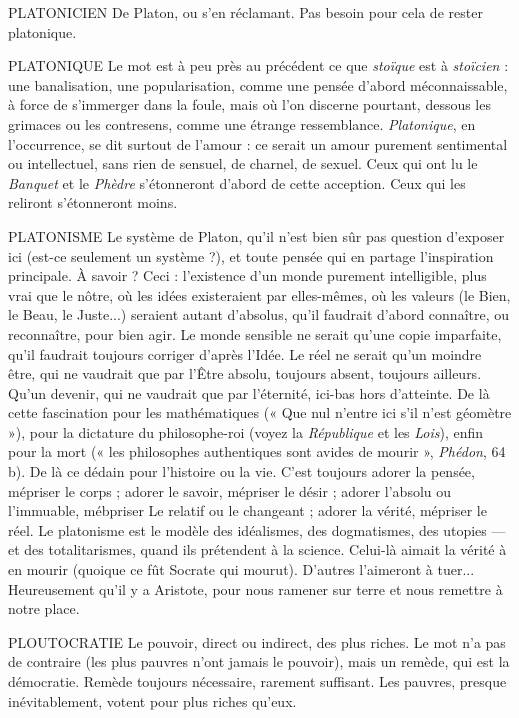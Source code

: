 PLATONICIEN De Platon, ou s’en réclamant. Pas besoin pour cela de rester
platonique.

PLATONIQUE Le mot est à peu près au précédent ce que {\it stoïque} est à
{\it stoïcien} : une banalisation, une popularisation, comme une
pensée d’abord méconnaissable, à force de s’immerger dans la foule, mais où
l’on discerne pourtant, dessous les grimaces ou les contresens, comme une
étrange ressemblance. {\it Platonique}, en l'occurrence, se dit surtout de l’amour : ce
serait un amour purement sentimental ou intellectuel, sans rien de sensuel, de
charnel, de sexuel. Ceux qui ont lu le {\it Banquet} et le {\it Phèdre} s'étonneront d’abord
de cette acception. Ceux qui les reliront s’étonneront moins.

PLATONISME Le système de Platon, qu’il n’est bien sûr pas question d’exposer
ici (est-ce seulement un système ?), et toute pensée
qui en partage l'inspiration principale. À savoir ? Ceci : l'existence d’un monde
purement intelligible, plus vrai que le nôtre, où les idées existeraient par elles-mêmes,
où les valeurs (le Bien, le Beau, le Juste...) seraient autant d’absolus,
qu’il faudrait d’abord connaître, ou reconnaître, pour bien agir. Le monde sensible
ne serait qu’une copie imparfaite, qu’il faudrait toujours corriger d’après
l’Idée. Le réel ne serait qu’un moindre être, qui ne vaudrait que par l'Être
absolu, toujours absent, toujours ailleurs. Qu'un devenir, qui ne vaudrait que
par l'éternité, ici-bas hors d’atteinte. De là cette fascination pour les mathématiques
(« Que nul n’entre ici s’il n’est géomètre »), pour la dictature du philosophe-roi
(voyez la {\it République} et les {\it Lois}), enfin pour la mort (« les philosophes
authentiques sont avides de mourir », {\it Phédon}, 64 b). De là ce dédain pour l’histoire
ou la vie. C’est toujours adorer la pensée, mépriser le corps ; adorer le
savoir, mépriser le désir ; adorer l'absolu ou l’immuable, mébpriser Le relatif ou
le changeant ; adorer la vérité, mépriser le réel. Le platonisme est le modèle des
idéalismes, des dogmatismes, des utopies — et des totalitarismes, quand ils prétendent
à la science. Celui-là aimait la vérité à en mourir (quoique ce fût
Socrate qui mourut). D’autres l’aimeront à tuer... Heureusement qu'il y a
Aristote, pour nous ramener sur terre et nous remettre à notre place.

PLOUTOCRATIE Le pouvoir, direct ou indirect, des plus riches. Le mot n'a
pas de contraire (les plus pauvres n’ont jamais le pouvoir),
mais un remède, qui est la démocratie. Remède toujours nécessaire, rarement suffisant.
Les pauvres, presque inévitablement, votent pour plus riches qu'eux.

